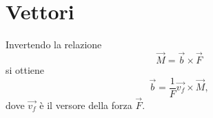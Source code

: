 \section{Vettori}
Invertendo la relazione
%
\begin{equation}
\vec{M}=\vec{b}\times\vec{F}
\end{equation}
%
si ottiene
%
\begin{equation}
\vec{b}=\frac{1}{F}\vec{v_{f}}\times\vec{M},
\end{equation}
%
dove $\vec{v_{f}}$ è il versore della forza $\vec{F}$.
%

